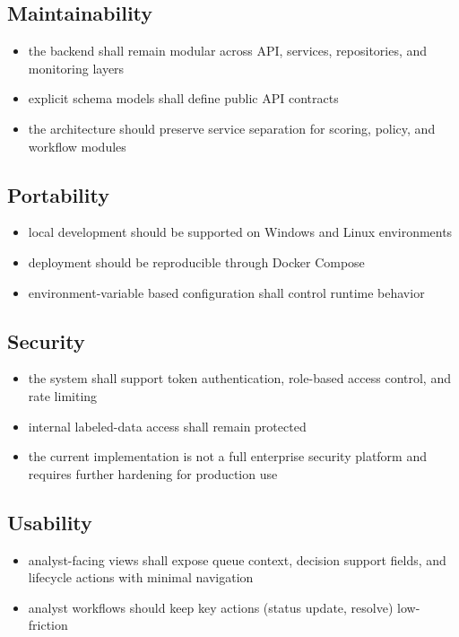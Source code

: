 \documentclass[11pt]{article}
\begin{document}
\subsection*{Maintainability}
\begin{itemize}
  \item the backend shall remain modular across API, services, repositories, and monitoring layers
  \item explicit schema models shall define public API contracts
  \item the architecture should preserve service separation for scoring, policy, and workflow modules
\end{itemize}

\subsection*{Portability}
\begin{itemize}
  \item local development should be supported on Windows and Linux environments
  \item deployment should be reproducible through Docker Compose
  \item environment-variable based configuration shall control runtime behavior
\end{itemize}

\subsection*{Security}
\begin{itemize}
  \item the system shall support token authentication, role-based access control, and rate limiting
  \item internal labeled-data access shall remain protected
  \item the current implementation is not a full enterprise security platform and requires further hardening for production use
\end{itemize}

\subsection*{Usability}
\begin{itemize}
  \item analyst-facing views shall expose queue context, decision support fields, and lifecycle actions with minimal navigation
  \item analyst workflows should keep key actions (status update, resolve) low-friction
\end{itemize}
\end{document}
